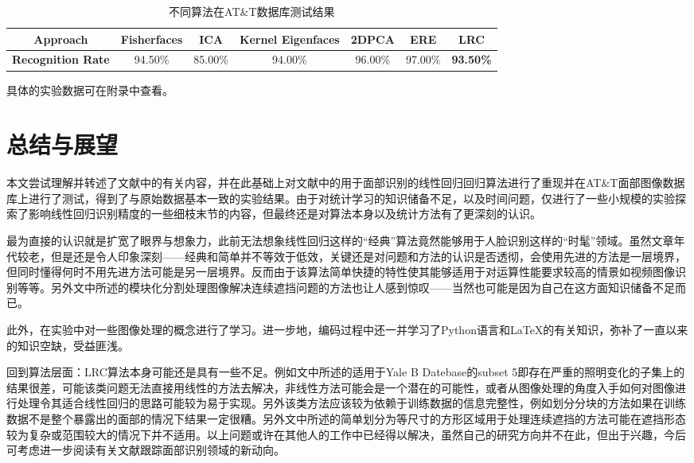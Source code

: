 \documentclass[UTF8]{ctexart}
\begin{document}
\begin{table}[htbp]
    \centering
    \caption{不同算法在AT\&T数据库测试结果}\label{tab-results_algorithms}
    \begin{tabular}{ccccccc}
        \toprule
        \textbf{Approach} & Fisherfaces & ICA & Kernel Eigenfaces & 2DPCA & ERE & \textbf{LRC} \\
        \midrule
        \textbf{Recognition Rate} & 94.50\% & 85.00\% & 94.00\% & 96.00\% & 97.00\% & \textbf{93.50\%} \\
        \bottomrule
    \end{tabular}
\end{table}
具体的实验数据可在附录中查看。

\section{总结与展望}\label{sec-4}
本文尝试理解并转述了文献\cite{5506092}中的有关内容，并在此基础上对文献中的用于面部识别的线性回归回归算法进行了重现并在AT\&T面部图像数据库上进行了测试，得到了与原始数据基本一致的实验结果。由于对统计学习的知识储备不足，以及时间问题，仅进行了一些小规模的实验探索了影响线性回归识别精度的一些细枝末节的内容，但最终还是对算法本身以及统计方法有了更深刻的认识。\par
最为直接的认识就是扩宽了眼界与想象力，此前无法想象线性回归这样的“经典”算法竟然能够用于人脸识别这样的“时髦”领域。虽然文章年代较老，但是还是令人印象深刻——经典和简单并不等效于低效，关键还是对问题和方法的认识是否透彻，会使用先进的方法是一层境界，但同时懂得何时不用先进方法可能是另一层境界。反而由于该算法简单快捷的特性使其能够适用于对运算性能要求较高的情景如视频图像识别等等。另外文中所述的模块化分割处理图像解决连续遮挡问题的方法也让人感到惊叹——当然也可能是因为自己在这方面知识储备不足而已。\par
此外，在实验中对一些图像处理的概念进行了学习。进一步地，编码过程中还一并学习了Python语言和LaTeX的有关知识，弥补了一直以来的知识空缺，受益匪浅。\par
回到算法层面：LRC算法本身可能还是具有一些不足。例如文中所述的适用于Yale B Datebase的subset 5即存在严重的照明变化的子集上的结果很差，可能该类问题无法直接用线性的方法去解决，非线性方法可能会是一个潜在的可能性，或者从图像处理的角度入手如何对图像进行处理令其适合线性回归的思路可能较为易于实现。另外该类方法应该较为依赖于训练数据的信息完整性，例如划分分块的方法如果在训练数据不是整个暴露出的面部的情况下结果一定很糟。另外文中所述的简单划分为等尺寸的方形区域用于处理连续遮挡的方法可能在遮挡形态较为复杂或范围较大的情况下并不适用。以上问题或许在其他人的工作中已经得以解决，虽然自己的研究方向并不在此，但出于兴趣，今后可考虑进一步阅读有关文献跟踪面部识别领域的新动向。
\appendix

\printindex %

\end{document}
